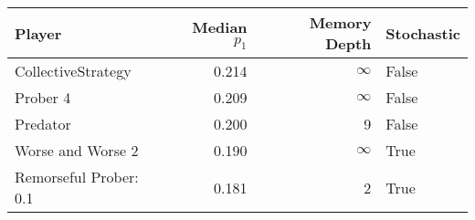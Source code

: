 \begin{tabular}{lrrl}
\toprule
                 Player &  Median $p_1$ &  Memory Depth & Stochastic \\
\midrule
     CollectiveStrategy &         0.214 &            \(\infty\) &      False \\
               Prober 4 &         0.209 &            \(\infty\) &      False \\
               Predator &         0.200 &             9 &      False \\
      Worse and Worse 2 &         0.190 &            \(\infty\) &       True \\
 Remorseful Prober: 0.1 &         0.181 &             2 &       True \\
\bottomrule
\end{tabular}
